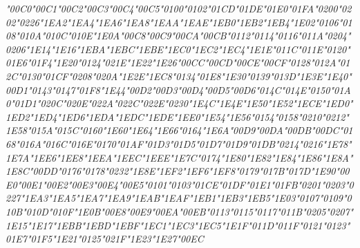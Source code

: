 {\LibertinusSerifPatch\itshape 
	\char"00C0\gs \char"00C1\gs \char"00C2\gs \char"00C3\gs \char"00C4\gs \char"00C5\gs \char"0100\gs \char"0102\gs \char"01CD\gs \char"01DE\gs \char"01E0\gs \char"01FA\gs \char"0200\gs \char"0202\gs \char"0226\gs \char"1EA2\gs \char"1EA4\gs \char"1EA6\gs \char"1EA8\gs \char"1EAA\gs \char"1EAE\gs \char"1EB0\gs \char"1EB2\gs \char"1EB4\gs \char"1E02\gs \char"0106\gs \char"0108\gs \char"010A\gs \char"010C\gs \char"010E\gs \char"1E0A\gs \char"00C8\gs \char"00C9\gs \char"00CA\gs \char"00CB\gs \char"0112\gs \char"0114\gs \char"0116\gs \char"011A\gs \char"0204\gs \char"0206\gs \char"1E14\gs \char"1E16\gs \char"1EBA\gs \char"1EBC\gs \char"1EBE\gs \char"1EC0\gs \char"1EC2\gs \char"1EC4\gs \char"1E1E\gs \char"011C\gs \char"011E\gs \char"0120\gs \char"01E6\gs \char"01F4\gs \char"1E20\gs \char"0124\gs \char"021E\gs \char"1E22\gs \char"1E26\gs \char"00CC\gs \char"00CD\gs \char"00CE\gs \char"00CF\gs \char"0128\gs \char"012A\gs \char"012C\gs \char"0130\gs \char"01CF\gs \char"0208\gs \char"020A\gs \char"1E2E\gs \char"1EC8\gs \char"0134\gs \char"01E8\gs \char"1E30\gs \char"0139\gs \char"013D\gs \char"1E3E\gs \char"1E40\gs \char"00D1\gs \char"0143\gs \char"0147\gs \char"01F8\gs \char"1E44\gs \char"00D2\gs \char"00D3\gs \char"00D4\gs \char"00D5\gs \char"00D6\gs \char"014C\gs \char"014E\gs \char"0150\gs \char"01A0\gs \char"01D1\gs \char"020C\gs \char"020E\gs \char"022A\gs \char"022C\gs \char"022E\gs \char"0230\gs \char"1E4C\gs \char"1E4E\gs \char"1E50\gs \char"1E52\gs \char"1ECE\gs \char"1ED0\gs \char"1ED2\gs \char"1ED4\gs \char"1ED6\gs \char"1EDA\gs \char"1EDC\gs \char"1EDE\gs \char"1EE0\gs \char"1E54\gs \char"1E56\gs \char"0154\gs \char"0158\gs \char"0210\gs \char"0212\gs \char"1E58\gs \char"015A\gs \char"015C\gs \char"0160\gs \char"1E60\gs \char"1E64\gs \char"1E66\gs \char"0164\gs \char"1E6A\gs \char"00D9\gs \char"00DA\gs \char"00DB\gs \char"00DC\gs \char"0168\gs \char"016A\gs \char"016C\gs \char"016E\gs \char"0170\gs \char"01AF\gs \char"01D3\gs \char"01D5\gs \char"01D7\gs \char"01D9\gs \char"01DB\gs \char"0214\gs \char"0216\gs \char"1E78\gs \char"1E7A\gs \char"1EE6\gs \char"1EE8\gs \char"1EEA\gs \char"1EEC\gs \char"1EEE\gs \char"1E7C\gs \char"0174\gs \char"1E80\gs \char"1E82\gs \char"1E84\gs \char"1E86\gs \char"1E8A\gs \char"1E8C\gs \char"00DD\gs \char"0176\gs \char"0178\gs \char"0232\gs \char"1E8E\gs \char"1EF2\gs \char"1EF6\gs \char"1EF8\gs \char"0179\gs \char"017B\gs \char"017D\gs \char"1E90\gs \char"00E0\gs \char"00E1\gs \char"00E2\gs \char"00E3\gs \char"00E4\gs \char"00E5\gs \char"0101\gs \char"0103\gs \char"01CE\gs \char"01DF\gs \char"01E1\gs \char"01FB\gs \char"0201\gs \char"0203\gs \char"0227\gs \char"1EA3\gs \char"1EA5\gs \char"1EA7\gs \char"1EA9\gs \char"1EAB\gs \char"1EAF\gs \char"1EB1\gs \char"1EB3\gs \char"1EB5\gs \char"1E03\gs \char"0107\gs \char"0109\gs \char"010B\gs \char"010D\gs \char"010F\gs \char"1E0B\gs \char"00E8\gs \char"00E9\gs \char"00EA\gs \char"00EB\gs \char"0113\gs \char"0115\gs \char"0117\gs \char"011B\gs \char"0205\gs \char"0207\gs \char"1E15\gs \char"1E17\gs \char"1EBB\gs \char"1EBD\gs \char"1EBF\gs \char"1EC1\gs \char"1EC3\gs \char"1EC5\gs \char"1E1F\gs \char"011D\gs \char"011F\gs \char"0121\gs \char"0123\gs \char"01E7\gs \char"01F5\gs \char"1E21\gs \char"0125\gs \char"021F\gs \char"1E23\gs \char"1E27\gs \char"00EC\gs }
